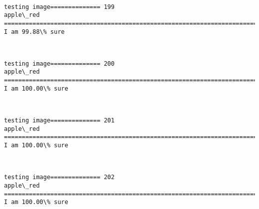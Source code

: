 \documentclass[11pt]{article}
\begin{document}
    \begin{center}
    \end{center}
    { \hspace*{\fill} \\}
    
    \begin{Verbatim}[commandchars=\\\{\}]
testing image============== 199
apple\_red
============================================================================
I am 99.88\% sure

    \end{Verbatim}

    \begin{center}
    \end{center}
    { \hspace*{\fill} \\}
    
    \begin{Verbatim}[commandchars=\\\{\}]
testing image============== 200
apple\_red
============================================================================
I am 100.00\% sure

    \end{Verbatim}

    \begin{center}
    \end{center}
    { \hspace*{\fill} \\}
    
    \begin{Verbatim}[commandchars=\\\{\}]
testing image============== 201
apple\_red
============================================================================
I am 100.00\% sure

    \end{Verbatim}

    \begin{center}
    \end{center}
    { \hspace*{\fill} \\}
    
    \begin{Verbatim}[commandchars=\\\{\}]
testing image============== 202
apple\_red
============================================================================
I am 100.00\% sure

    \end{Verbatim}
\end{document}
